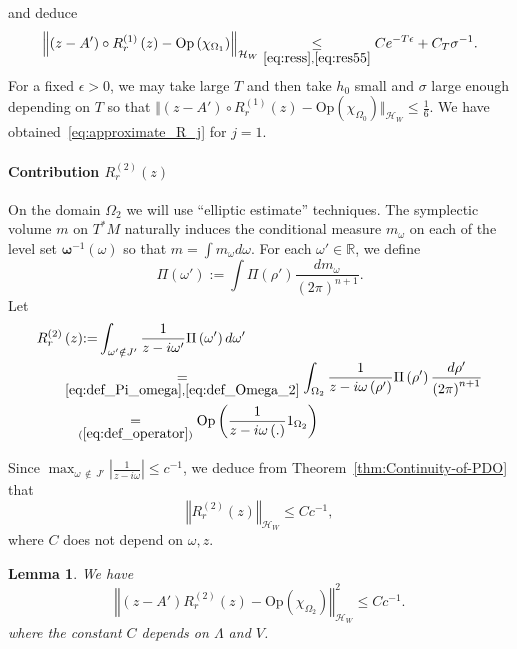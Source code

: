 \documentclass[10pt]{amsart}
\newtheorem{lemm}[theo]{Lemma}\newtheorem{prop}[theo]{Proposition}\newtheorem{coro}[theo]{Corollary}\newtheorem{conj}[theo]{Conjecture}
\theoremstyle{definition}\newtheorem{defi}[theo]{Definition}\newtheorem{rema}[theo]{Remark}\newtheorem{exam}[theo]{Example}\newtheorem{exem}[theo]{Example}\newtheorem{nota}[theo]{Notation}
\newcommand*\eq[1]{\underset{(#1)}{=}}
\newcommand{\clH}{\mathcal{H}}
\newcommand{\Opp}{\mathrm{Op}}
\newcommand{\bbR}{\mathbb{R}}
\begin{document}
and deduce
\[
\left\Vert \left(z-A'\right)\circ R_{r}^{\left(1\right)}\left(z\right)-\Opp \left(\chi_{\Omega_{1}}\right)\right\Vert _{\clH _{W}}\underset{\eqref{eq:ress},\eqref{eq:res55}}{\leq}Ce^{-T\epsilon}+C_{T}\sigma^{-1}.
\]
For a fixed $\epsilon>0$, we may take large $T$ and then take $h_{0}$ small and $\sigma$ large enough depending on $T$ so that $\Vert (z-A')\circ R_{r}^{(1)}(z)-\Opp (\chi_{\Omega_{0}})\Vert _{\clH _{W}}\leq\frac{1}{6}$. We have obtained~\eqref{eq:approximate_R_j} for $j=1$.


\paragraph{Contribution $R_{r}^{(2)}(z)$}

On the domain $\Omega_{2}$ we will use ``elliptic estimate'' techniques. The symplectic volume $m$ on $T^{*}M$ naturally induces the conditional measure $m_{\omega}$ on each of the level set $\boldsymbol{\omega}{}^{-1}(\omega)$ so that $m=\int m_{\omega}d\omega$. For each $\omega'\in\bbR$, we define
\begin{equation}\label{eq:def_Pi_omega}
\Pi\left(\omega'\right):=\int\Pi\left(\rho'\right)\frac{dm_{\omega}}{\left(2\pi\right)^{n+1}}.
\end{equation}
Let
\begin{align*}
R_{r}^{\left(2\right)}\left(z\right) &{:=}\int_{\omega'\notin J'}\frac{1}{z-i\omega'}\Pi\left(\omega'\right)d\omega'\\
& \mkern-28mu\underset{\eqref{eq:def_Pi_omega},\eqref{eq:def_Omega_2}}{=}\int_{\Omega_{2}}\frac{1}{z-i\omega\left(\rho'\right)}\Pi\left(\rho'\right)\frac{d\rho'}{\left(2\pi\right)^{n+1}}\\
& \mkern-11mu\eq{\ref{eq:def_operator}}\Opp \left(\frac{1}{z-i\omega\left(.\right)}\mathrm{1}_{\Omega_{2}}\right)
\end{align*}

Since $\max_{\omega\,\notin\,J'}|\frac{1}{z-i\omega}|\leq c^{-1}$, we deduce from Theorem~\ref{thm:Continuity-of-PDO} that
\begin{equation}\label{eq:norm_B}
\left\Vert R_{r}^{\left(2\right)}\left(z\right)\right\Vert _{\clH _{W}}\le Cc^{-1},
\end{equation}
where $C$ does not depend on $\omega,z$.

\begin{lemm}\label{lem:bound_norm_D}
We have
\begin{equation}\label{eq:norm_D}
\left\Vert \left(z-A'\right)R_{r}^{\left(2\right)}\left(z\right)-\Opp \left(\chi_{\Omega_{2}}\right)\right\Vert _{\clH _{W}}^{2}\le Cc^{-1}.
\end{equation}
where the constant $C$ depends on $\Lambda$ and $V$.
\end{lemm}
\end{document}
